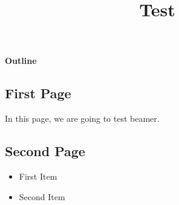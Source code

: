 \documentclass{beamer}
\title{Test}
\begin{document}
\maketitle
\begin{frame}
\textbf{Outline}
\newline
\tableofcontents
\end{frame}
\begin{frame}
\section{First Page}
In this page, we are going to test beamer.
\end{frame}
\begin{frame}
\section{Second Page}
\begin{itemize}
\item First Item
\item Second Item
\end{itemize}
\end{frame}
\end{document}
